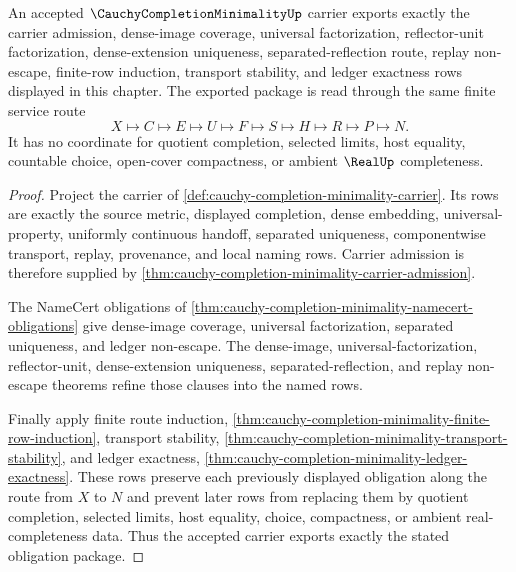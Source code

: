 \begin{theorem}
\label{thm:cauchy-completion-minimality-obligation-export}
An accepted $\CauchyCompletionMinimalityUp$ carrier exports exactly the carrier admission, dense-image coverage, universal factorization, reflector-unit factorization, dense-extension uniqueness, separated-reflection route, replay non-escape, finite-row induction, transport stability, and ledger exactness rows displayed in this chapter. The exported package is read through the same finite service route
$$
X\longmapsto C\longmapsto E\longmapsto U\longmapsto F\longmapsto S\longmapsto H\longmapsto R\longmapsto P\longmapsto N .
$$
It has no coordinate for quotient completion, selected limits, host equality, countable choice, open-cover compactness, or ambient $\RealUp$ completeness.
\end{theorem}
\begin{proof}
Project the carrier of \autoref{def:cauchy-completion-minimality-carrier}. Its rows are exactly the source metric, displayed completion, dense embedding, universal-property, uniformly continuous handoff, separated uniqueness, componentwise transport, replay, provenance, and local naming rows. Carrier admission is therefore supplied by \autoref{thm:cauchy-completion-minimality-carrier-admission}.

The NameCert obligations of \autoref{thm:cauchy-completion-minimality-namecert-obligations} give dense-image coverage, universal factorization, separated uniqueness, and ledger non-escape. The dense-image, universal-factorization, reflector-unit, dense-extension uniqueness, separated-reflection, and replay non-escape theorems refine those clauses into the named rows.

Finally apply finite route induction, \autoref{thm:cauchy-completion-minimality-finite-row-induction}, transport stability, \autoref{thm:cauchy-completion-minimality-transport-stability}, and ledger exactness, \autoref{thm:cauchy-completion-minimality-ledger-exactness}. These rows preserve each previously displayed obligation along the route from $X$ to $N$ and prevent later rows from replacing them by quotient completion, selected limits, host equality, choice, compactness, or ambient real-completeness data. Thus the accepted carrier exports exactly the stated obligation package.
\end{proof}


